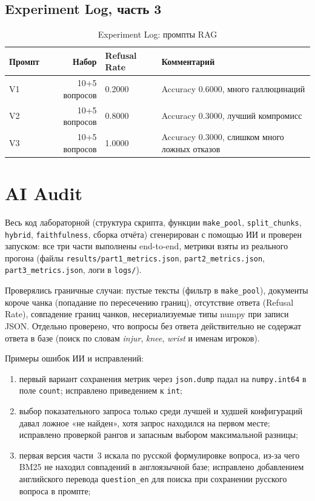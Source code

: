 \documentclass[14pt,a4paper]{extarticle}
\begin{document}
\subsection*{Experiment Log, часть 3}

\begin{table}[H]
    \centering
    \caption*{\raggedleft Experiment Log: промпты RAG}
    \label{tab:log3}
    \small
    \begin{tabular}{l r l >{\raggedright\arraybackslash}p{}}
        \toprule
        Промпт & Набор & Refusal Rate & Комментарий \\
        \midrule
        V1 & 10+5 вопросов & 0.2000 & Accuracy 0.6000, много галлюцинаций \\
        V2 & 10+5 вопросов & 0.8000 & Accuracy 0.3000, лучший компромисс \\
        V3 & 10+5 вопросов & 1.0000 & Accuracy 0.3000, слишком много ложных отказов \\
        \bottomrule
    \end{tabular}
\end{table}

\section{AI Audit}

Весь код лабораторной (структура скрипта, функции \texttt{make\_pool},
\texttt{split\_chunks}, \texttt{hybrid}, \texttt{faithfulness}, сборка отчёта)
сгенерирован с помощью ИИ и проверен запуском: все три части выполнены
end-to-end, метрики взяты из реального прогона (файлы
\texttt{results/part1\_metrics.json}, \texttt{part2\_metrics.json},
\texttt{part3\_metrics.json}, логи в \texttt{logs/}).

Проверялись граничные случаи: пустые тексты (фильтр в \texttt{make\_pool}),
документы короче чанка (попадание по пересечению границ), отсутствие ответа
(Refusal Rate), совпадение границ чанков, несериализуемые типы numpy при
записи JSON. Отдельно проверено, что вопросы без ответа действительно не
содержат ответа в базе (поиск по словам \textit{injur}, \textit{knee},
\textit{wrist} и именам игроков).

Примеры ошибок ИИ и исправлений:
\begin{enumerate}
    \item первый вариант сохранения метрик через \texttt{json.dump} падал
          на \texttt{numpy.int64} в поле \texttt{count}; исправлено приведением
          к \texttt{int};
    \item выбор показательного запроса только среди лучшей и худшей
          конфигураций давал ложное «не найден», хотя запрос находился
          на первом месте; исправлено проверкой рангов и запасным выбором
          максимальной разницы;
    \item первая версия части~3 искала по русской формулировке вопроса,
          из-за чего BM25 не находил совпадений в англоязычной базе;
          исправлено добавлением английского перевода \texttt{question\_en}
          для поиска при сохранении русского вопроса в промпте;
\end{enumerate}
\end{document}
